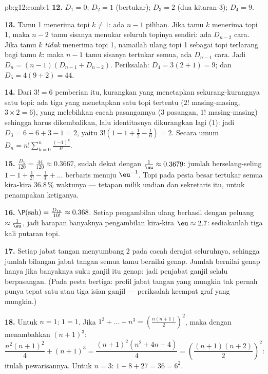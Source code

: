 \begin{solution}{pb:g12:comb:1}
\textbf{12.} $D_1 = 0$; $D_2 = 1$ (bertukar); $D_3 = 2$ (dua
kitaran-$3$); $D_4 = 9$.

\textbf{13.} Tamu 1 menerima topi $k \neq 1$: ada $n - 1$ pilihan. Jika
tamu $k$ menerima topi 1, maka $n - 2$ tamu sisanya menukar seluruh
topinya sendiri: ada $D_{n-2}$ cara. Jika tamu $k$ \emph{tidak}
menerima topi 1, namailah ulang topi 1 sebagai topi terlarang bagi tamu $k$:
maka $n - 1$ tamu sisanya tertukar semua, ada $D_{n-1}$ cara. Jadi
$D_n = (n-1)(D_{n-1} + D_{n-2})$. Periksalah:
$D_4 = 3(2 + 1) = 9$; dan $D_5 = 4(9 + 2) = 44$.

\textbf{14.} Dari $3! = 6$ pemberian itu, kurangkan yang
menetapkan sekurang-kurangnya satu topi: ada tiga yang menetapkan satu topi
tertentu ($2!$ masing-masing, $3 \times 2 = 6$), yang melebihkan cacah
pasangannya ($3$ pasangan, $1!$ masing-masing) sehingga harus dikembalikan,
lalu identitasnya dikurangkan lagi ($1$): jadi $D_3 = 6 - 6 + 3 - 1 = 2$, yaitu
$3!\left(1 - 1 + \frac12 - \frac16\right) = 2$. Secara umum
$D_n = n!\sum_{k=0}^{n} \frac{(-1)^k}{k!}$.

\textbf{15.} $\frac{D_5}{120} = \frac{44}{120} \approx
0.3667$, sudah dekat dengan $\frac1\eu \approx 0.3679$: jumlah
berselang-seling $1 - 1 + \frac{1}{2!} - \frac{1}{3!} + \dots$
berbaris menuju $\eu^{-1}$. Topi pada pesta besar tertukar semua kira-kira
$36.8\,\%$ waktunya --- tetapan milik undian dan sekretaris
itu, untuk penampakan ketiganya.

\textbf{16.} $\P(\text{sah}) = \frac{D_{10}}{10!} \approx
0.368$. Setiap pengambilan ulang berhasil dengan peluang
$\approx \frac1\eu$, jadi harapan banyaknya pengambilan kira-kira
$\eu \approx 2.7$: sediakanlah tiga kali putaran topi.

\textbf{17.} Setiap jabat tangan menyumbang $2$ pada cacah derajat
seluruhnya, sehingga jumlah bilangan jabat tangan semua tamu
bernilai genap. Jumlah  bernilai genap hanya jika banyaknya
suku ganjil itu genap: jadi penjabat ganjil selalu berpasangan. (Pada pesta
bertiga: profil jabat tangan yang mungkin tak pernah punya tepat satu atau
tiga isian ganjil --- periksalah keempat graf yang mungkin.)

\textbf{18.} Untuk $n = 1$: $1 = 1$. Jika
$1^3 + \dots + n^3 = \left(\frac{n(n+1)}{2}\right)^2$, maka dengan menambahkan
$(n+1)^3$:
\[
\frac{n^2(n+1)^2}{4} + (n+1)^3
= \frac{(n+1)^2\left(n^2 + 4n + 4\right)}{4}
= \left(\frac{(n+1)(n+2)}{2}\right)^{\!2} :
\]
itulah pewarisannya. Untuk $n = 3$: $1 + 8 + 27 = 36 = 6^2$.


\end{solution}
